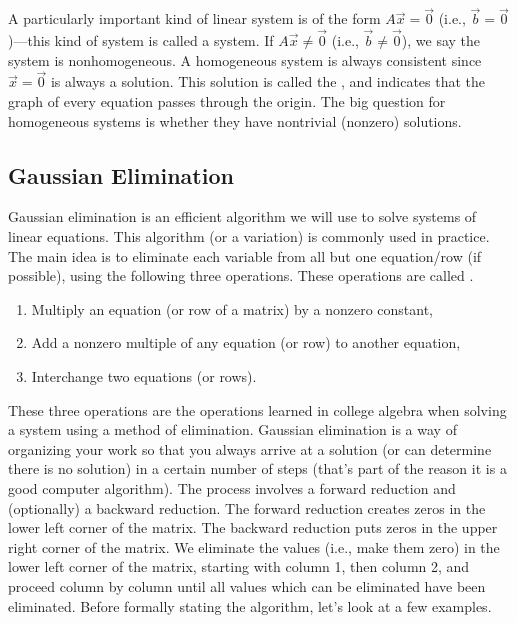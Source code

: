 A particularly important kind of linear system is of the form $A\vec x
= \vec 0$ (i.e., $\vec b=\vec 0$)---this kind of system is called a
 system.
% 
If $A\vec x\neq \vec 0$ (i.e., $\vec b \neq \vec 0$), we say the
system is nonhomogeneous.  A homogeneous system is always consistent
since $\vec x=\vec 0$ is always a solution.  This solution is called
the , and indicates that the graph of every equation
passes through the origin.  The big question for homogeneous systems
is whether they have nontrivial (nonzero) solutions.

\subsection{Gaussian Elimination}

Gaussian elimination is an efficient algorithm we will use to solve
systems of linear equations. This algorithm (or a variation) is commonly used
in practice.  The main idea is to eliminate each variable from all but
one equation/row (if possible), using the following three operations.
These operations are called .
\begin{enumerate}
  \item Multiply an equation (or row of a matrix) by a nonzero constant,
  \item Add a nonzero multiple of any equation (or row) to another equation,
  \item Interchange two equations (or rows).
\end{enumerate}
These three operations are the operations learned in college algebra
when solving a system using a method of elimination.  Gaussian
elimination is a way of organizing your work so that you always arrive
at a solution (or can determine there is no solution) in a certain
number of steps (that's part of the reason it is a good computer
algorithm). The process involves a forward reduction and (optionally)
a backward reduction. The forward reduction creates zeros in the lower
left corner of the matrix.  The backward reduction puts zeros in the
upper right corner of the matrix. We eliminate the values (i.e., make
them zero) in the lower left corner of the matrix, starting with
column 1, then column 2, and proceed column by column until all
values which can be eliminated have been
eliminated. Before formally stating the algorithm, let's look at a few
examples.

